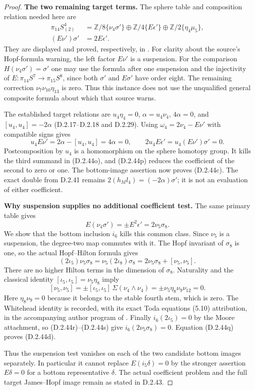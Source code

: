 \begin{proof}
\medskip\noindent
\textbf{The two remaining target terms.}
The sphere table and composition relation needed here are
\[
\begin{split}
 \pi_{14}S^4_{(2)}
    &=\mathbb Z/8\{\nu_4\sigma'\}
      \oplus\mathbb Z/4\{E\epsilon'\}
      \oplus\mathbb Z/2\{\eta_4\mu_5\},\\
 (E\nu')\sigma'&=2E\epsilon'.
\end{split}
 \tag{D.2.44o}
\]
They are displayed and proved, respectively, in
\cite[Propositions 7 and 13, pp.~7--9]{FGHStricklandToda}.
For clarity about the source's Hopf-formula warning, the
left factor $E\nu'$ is a suspension.  For the comparison
$H(\nu_4\sigma')=\sigma'$ one may use the formula after
one suspension and the injectivity of
$E:\pi_{14}S^7\to\pi_{15}S^8$, since both $\sigma'$
and $E\sigma'$ have order eight.  The remaining correction
$\nu_7\nu_{10}\eta_{13}$ is zero.  Thus this instance
does not use the unqualified general composite formula
about which that source warns.

The established target relations are
$u_4\eta_4=0$, $\alpha=u_4\nu_4$, $4\alpha=0$, and
$[u_4,u_4]=-2\alpha$ (D.2.17--D.2.18 and D.2.29).
Using $\omega_4=2\nu_4-E\nu'$ with compatible signs gives
\[
 u_4E\nu'=2\alpha-[u_4,u_4]=4\alpha=0,
 \qquad
 2u_4E\epsilon'=u_4(E\nu')\sigma'=0.
 \tag{D.2.44p}
\]
Postcomposition by $u_4$ is a homomorphism on the sphere
homotopy group.  It kills the third summand in (D.2.44o),
and (D.2.44p) reduces the coefficient of the second to
zero or one.  The bottom-image assertion now proves
(D.2.44c).  The exact double from D.2.41 remains
$2(h_Ml_4)=(-2\alpha)\sigma'$; it is not an evaluation
of either coefficient.

\medskip\noindent
\textbf{Why suspension supplies no additional coefficient test.}
The same primary table gives
\[
 E(\nu_4\sigma')=\pm E^2\epsilon'
                 =2\nu_5\sigma_8.
 \tag{D.2.44q}
\]
We show that the bottom inclusion $i_6$ kills this common
class.  Since $\nu_5$ is a suspension, the degree-two map
commutes with it.  The Hopf invariant of $\sigma_8$ is one,
so the actual Hopf--Hilton formula gives
\[
 (2\iota_5)\nu_5\sigma_8
 =\nu_5(2\iota_8)\sigma_8
 =2\nu_5\sigma_8+[\nu_5,\nu_5].
 \tag{D.2.44r}
\]
There are no higher Hilton terms in the dimension of
$\sigma_8$.  Naturality and the classical identity
$[\iota_5,\iota_5]=\nu_5\eta_8$ imply
\[
 [\nu_5,\nu_5]
 =\pm[\iota_5,\iota_5]\,\Sigma(\nu_4\wedge\nu_4)
 =\pm\nu_5\eta_8\nu_9\nu_{12}=0.
 \tag{D.2.44s}
\]
Here $\eta_8\nu_9=0$ because it belongs to the stable
fourth stem, which is zero.  The Whitehead identity is
recorded, with its exact Toda equations (5.10) attribution,
in the accompanying author program of
\cite{FGHStricklandToda}.  Finally $i_6(2\iota_5)=0$
by the Moore attachment, so (D.2.44r)--(D.2.44s) give
$i_6(2\nu_5\sigma_8)=0$.  Equation (D.2.44q) proves
(D.2.44d).

Thus the suspension test vanishes on each of the two
candidate bottom images separately.  In particular it
cannot replace $E(i_5\delta)=0$ by the stronger assertion
$E\delta=0$ for a bottom representative $\delta$.
The actual coefficient problem and the full target
James--Hopf image remain as stated in D.2.43.
\end{proof}
